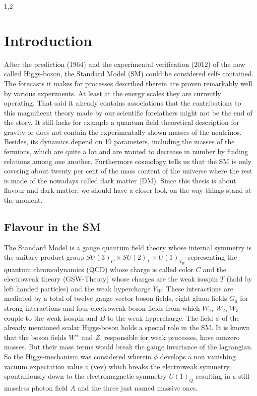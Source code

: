 \documentclass[11pt,a4paper,twoside]{article}
\begin{document}
\begin{spacing}{1,2}

\thispagestyle{empty}
 \cleardoublepage

\setcounter{page}{1}
\pagestyle{fancy}

\section{Introduction}
After the prediction (1964) and the experimental verification (2012) of the
now called Higgs-boson, the Standard Model (SM) could be considered self-
contained. The forecasts it makes for processes described therein are proven
remarkably well by various experiments. At least at the energy scales they
are currently operating. That said it already contains associations that the
contributions to this magnificent theory made by our scientific forefathers might not be
the end of the story. It still lacks for example a quantum field theoretical
description for gravity or does not contain the experimentally shown masses
of the neutrinos. Besides, its dynamics depend on 19 parameters, including
the masses of the fermions, which are quite a lot and are wanted to decrease
in number by finding relations among one another. Furthermore cosmology
tells us that the SM is only covering about twenty per cent of the mass content
of the universe where the rest is made of the nowadays called dark matter
(DM). Since this thesis is about flavour and dark matter, we
should have a closer look on the way things stand at the moment.

\subsection{Flavour in the SM}
The Standard Model is a gauge quantum field theory whose internal symmetry is the unitary product group $SU(3)_C\times SU(2)_L\times U(1)_{Y_W}$ representing
the quantum chromodynamics (QCD) whose charge is called color $C$ and the electroweak theory (GSW-Theory) whose charges are the weak isospin $T$ 
(hold by left handed particles) and the 
weak hypercharge $Y_W$. These interactions are mediated by a total of twelve gauge vector boson fields, eight gluon fields $G_a$ for strong interactions and four 
electroweak boson fields from which $W_1$, $W_2$, $W_3$ couple to the weak isospin and $B$ to the weak hypercharge. The field $\phi$ of the already mentioned scalar
Higgs-boson holds a special role in the SM. It is known that the boson fields $W^\pm$ and $Z$, responsible for weak processes, have nonzero masses. But their
mass terms would break the gauge invariance of the lagrangian. So the Higgs-mechanism was considered wherein $\phi$ develops a non vanishing vacuum expectation
value $v$ (vev) which breaks the electroweak symmetry spontaniously down to the electromagnetic symmetry $U(1)_Q$ resulting in a still massless photon field 
$A$ and the three just named massive ones.

\end{spacing}
\end{document}
